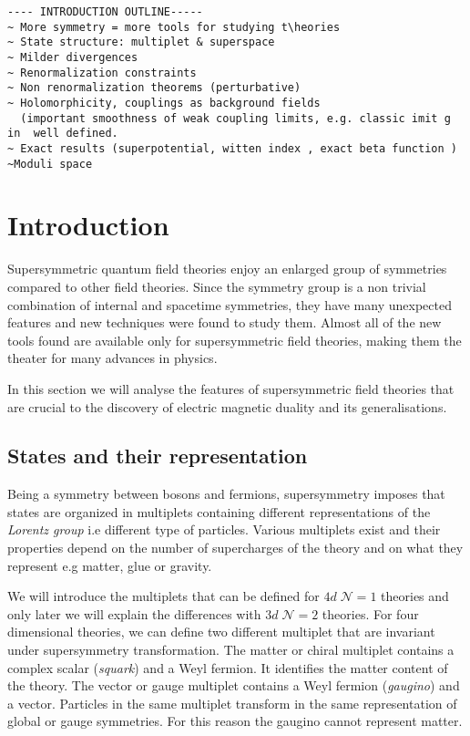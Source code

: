 \begin{lstlisting}
---- INTRODUCTION OUTLINE-----
~ More symmetry = more tools for studying t\heories
~ State structure: multiplet & superspace
~ Milder divergences 
~ Renormalization constraints
~ Non renormalization theorems (perturbative)
~ Holomorphicity, couplings as background fields 
  (important smoothness of weak coupling limits, e.g. classic imit g in  well defined.
~ Exact results (superpotential, witten index , exact beta function )
~Moduli space
\end{lstlisting}

\section{Introduction}
Supersymmetric quantum field theories enjoy an enlarged group of  symmetries compared to other field theories. 
Since the symmetry group is a non trivial combination of internal and spacetime symmetries, they have many unexpected features and new techniques were found to study them.
Almost all of the new tools found are available only for supersymmetric field theories, making them the theater for many advances in physics. 

In this section we will analyse the features of supersymmetric field theories that are crucial to the discovery of electric magnetic duality and its generalisations.

\subsection{States and their representation}

Being a symmetry between bosons and fermions, supersymmetry imposes that states are organized in multiplets containing different representations of the \emph{Lorentz group} i.e different type of  particles.
Various multiplets exist and their properties depend on the number of supercharges of the theory and on what they represent e.g matter, glue or gravity. 

We will introduce the multiplets that can be defined for $4d \; \mathcal{N} = 1$ theories and only later we will explain the differences with $3d \; \mathcal{N} = 2$ theories.
For four dimensional theories, we can define two different multiplet that are invariant under supersymmetry transformation.
The matter or chiral multiplet contains a complex scalar (\emph{squark}) and a Weyl fermion. It identifies the matter content of the theory.
The vector or gauge multiplet contains a Weyl fermion (\emph{gaugino}) and a vector.
Particles in the same multiplet transform in the same representation of global or gauge symmetries. For this reason the gaugino cannot represent matter.

